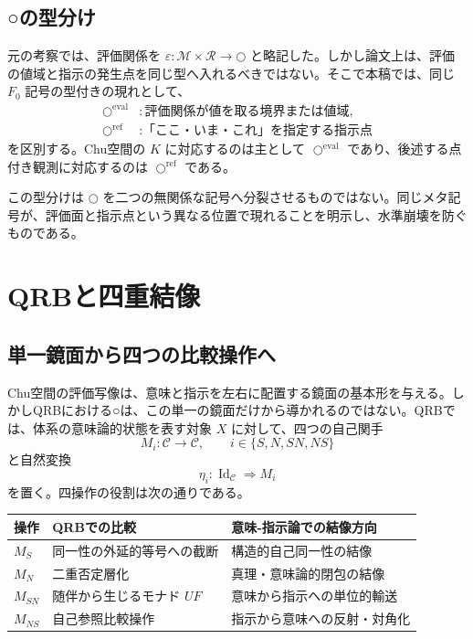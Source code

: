 \documentclass[a4paper,11pt]{ltjsarticle}
\theoremstyle{definition}
\theoremstyle{plain}
\newcommand{\CircleRef}{\bigcirc^{\mathrm{ref}}}
\newcommand{\CircleEval}{\bigcirc^{\mathrm{eval}}}
\newcommand{\Obj}{\mathcal M}
\newcommand{\Obs}{\mathcal R}
\begin{document}
\subsection{○の型分け}

元の考察では、評価関係を $\varepsilon:\Obj\times\Obs\to\bigcirc$ と略記した。しかし論文上は、評価の値域と指示の発生点を同じ型へ入れるべきではない。そこで本稿では、同じ $F_0$ 記号の型付きの現れとして、
\begin{align}
 \CircleEval &:\text{評価関係が値を取る境界または値域},\\
 \CircleRef &:\text{「ここ・いま・これ」を指定する指示点}
\end{align}
を区別する。Chu空間の $K$ に対応するのは主として $\CircleEval$ であり、後述する点付き観測に対応するのは $\CircleRef$ である。

この型分けは $\bigcirc$ を二つの無関係な記号へ分裂させるものではない。同じメタ記号が、評価面と指示点という異なる位置で現れることを明示し、水準崩壊を防ぐものである。

\section{QRBと四重結像}

\subsection{単一鏡面から四つの比較操作へ}

Chu空間の評価写像は、意味と指示を左右に配置する鏡面の基本形を与える。しかしQRBにおける○は、この単一の鏡面だけから導かれるのではない。QRBでは、体系の意味論的状態を表す対象 $X$ に対して、四つの自己関手
\begin{equation}
 M_i:\mathcal C\longrightarrow\mathcal C,
 \qquad
 i\in\{S,N,SN,NS\}
\end{equation}
と自然変換
\begin{equation}
 \eta_i:\operatorname{Id}_{\mathcal C}\Longrightarrow M_i
\end{equation}
を置く\cite{ChibaQRB2026}。四操作の役割は次の通りである。

\begin{center}
\begin{tabular}{p{} p{} p{}}
\toprule
操作 & QRBでの比較 & 意味‐指示論での結像方向 \\
\midrule
$M_S$ & 同一性の外延的等号への截断 & 構造的自己同一性の結像 \\
$M_N$ & 二重否定層化 & 真理・意味論的閉包の結像 \\
$M_{SN}$ & 随伴から生じるモナド $UF$ & 意味から指示への単位的輸送 \\
$M_{NS}$ & 自己参照比較操作 & 指示から意味への反射・対角化 \\
\bottomrule
\end{tabular}
\end{center}
\end{document}
